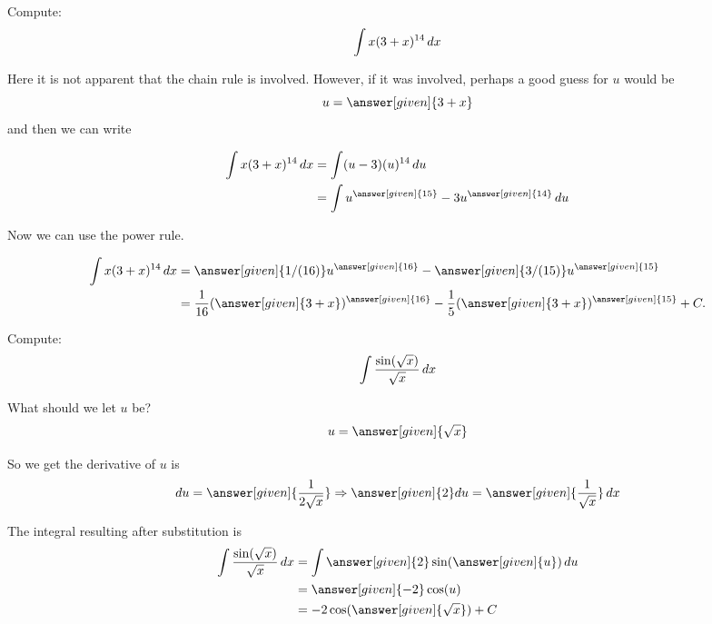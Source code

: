 \documentclass{ximera}
\begin{document}
\begin{example}
  Compute:
\[
\int x(3+x)^{14}\mathop{}\!d x
\]
\begin{explanation}
Here it is not apparent that the chain rule is involved. However, if
it was involved, perhaps a good guess for $u$ would be
\[
u = \answer[given]{3+x}
\]
and then we can write

\begin{align*}
    \int x(3+x)^{14}\d x &= \int(u-3)(u)^{14}\d u\\
    &= \int u^{\answer[given]{15}}-3u^{\answer[given]{14}}\d u
\end{align*}

Now we can use the power rule.

\begin{align*}
    \int x(3+x)^{14}\d x &= \answer[given]{1/(16)}u^{\answer[given]{16}}-\answer[given]{3/(15)}u^{\answer[given]{15}}\\
    &= \frac{1}{16}(\answer[given]{3+x})^{\answer[given]{16}}-\frac{1}{5}(\answer[given]{3+x})^{\answer[given]{15}}+C.
\end{align*}
\end{explanation}
\end{example}


\begin{example}
Compute:
\[
\int \frac{\sin(\sqrt{x})}{\sqrt{x}}\mathop{}\!d x
\]
\begin{explanation}
What should we let $u$ be?
\[
u = \answer[given]{\sqrt{x}}
\]

So we get the derivative of $u$ is 
\[
\d u = \answer[given]{\frac{1}{2\sqrt{x}}} \Rightarrow \answer[given]{2}du=\answer[given]{\frac{1}{\sqrt{x}}} \d x
\]

The integral resulting after substitution is
\begin{align*}
\int \frac{\sin(\sqrt{x})}{\sqrt{x}}\d x &= \int\answer[given]{2}\sin(\answer[given]{u})\d u\\
&= \answer[given]{-2}\cos(u)\\
&=-2\cos(\answer[given]{\sqrt{x}})+C
\end{align*}


\end{explanation}
\end{example}
\end{document}
